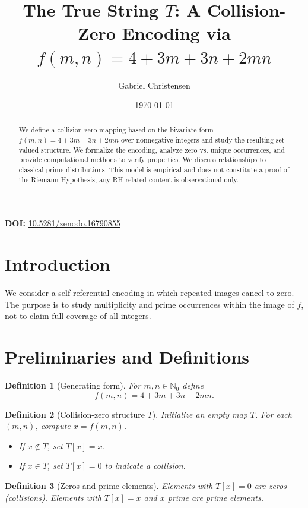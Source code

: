 \documentclass[12pt,a4paper]{article}
\title{The True String \(T\): A Collision-Zero Encoding via \(f(m,n)=4+3m+3n+2mn\)}
\author{Gabriel Christensen}
\date{\today}
\newtheorem{definition}{Definition}[section]
\begin{document}
\maketitle
\noindent\textbf{DOI:} \href{https://doi.org/10.5281/zenodo.16790855}{10.5281/zenodo.16790855}

\begin{abstract}
We define a collision-zero mapping based on the bivariate form \(f(m,n)=4+3m+3n+2mn\) over nonnegative integers and study the resulting set-valued structure. We formalize the encoding, analyze zero vs. unique occurrences, and provide computational methods to verify properties. We discuss relationships to classical prime distributions. This model is empirical and does not constitute a proof of the Riemann Hypothesis; any RH-related content is observational only.
\end{abstract}

\tableofcontents
\newpage

\section{Introduction}
We consider a self-referential encoding in which repeated images cancel to zero. The purpose is to study multiplicity and prime occurrences within the image of \(f\), not to claim full coverage of all integers.

\section{Preliminaries and Definitions}
\begin{definition}[Generating form]\label{def:f}
For \(m,n\in\mathbb{N}_0\) define
\[
 f(m,n) = 4 + 3m + 3n + 2mn.
\]
\end{definition}

\begin{definition}[Collision-zero structure \(T\)]\label{def:T}
Initialize an empty map \(T\). For each \((m,n)\), compute \(x = f(m,n)\).
\begin{itemize}
    \item If \(x\notin T\), set \(T[x]=x\).
    \item If \(x\in T\), set \(T[x]=0\) to indicate a collision.
\end{itemize}
\end{definition}

\begin{definition}[Zeros and prime elements]
Elements with \(T[x]=0\) are \emph{zeros} (collisions). Elements with \(T[x]=x\) and \(x\) prime are \emph{prime elements}.
\end{definition}
\end{document}
